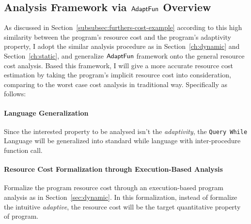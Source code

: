 \subsection{Analysis Framework via $\textsf{AdaptFun}$ Overview}
\label{sec:generalcost-methodology}
As discussed in Section~\ref{subsubsec:furthers-cost-example}
according to this high similarity between the program's resource cost and the 
program's adaptivity property, I adopt the similar analysis procedure as in Section~\ref{ch:dynamic} and 
Section~\ref{ch:static},
and generalize 
$\textsf{AdaptFun}$ framework onto the general resource cost analysis. 
Based this framework,
I will give
a more accurate resource cost estimation by taking the program's implicit resource cost into consideration, comparing 
to the worst case cost analysis in traditional way. Specifically as follows:
\paragraph*{Language Generalization} Since the interested property 
to be analysed isn't the \emph{adaptivity},
the {\tt Query While} Language will be generalized into standard while language with inter-procedure function call.
\paragraph*{Resource Cost Formalization through Execution-Based Analysis} 
Formalize the program resource cost through an execution-based program analysis as in Section~\ref{sec:dynamic}.
In this formalization, instead of formalize the intuitive \emph{adaptive}, the resource cost will be the
target quantitative property of program.
